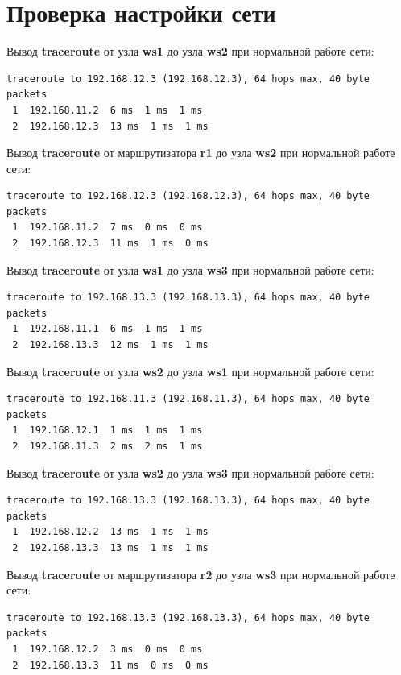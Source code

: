 \documentclass[a4paper,12pt]{article}
\begin{document}
\section{Проверка настройки сети}

Вывод \textbf{traceroute} от узла \textbf{ws1} до узла \textbf{ws2} при нормальной работе сети:

\begin{Verbatim}
traceroute to 192.168.12.3 (192.168.12.3), 64 hops max, 40 byte packets
 1  192.168.11.2  6 ms  1 ms  1 ms
 2  192.168.12.3  13 ms  1 ms  1 ms
\end{Verbatim}

Вывод \textbf{traceroute} от маршрутизатора \textbf{r1} до узла \textbf{ws2} при нормальной работе сети:

\begin{Verbatim}
traceroute to 192.168.12.3 (192.168.12.3), 64 hops max, 40 byte packets
 1  192.168.11.2  7 ms  0 ms  0 ms
 2  192.168.12.3  11 ms  1 ms  0 ms
\end{Verbatim}

Вывод \textbf{traceroute} от узла \textbf{ws1} до узла \textbf{ws3} при нормальной работе сети:

\begin{Verbatim}
traceroute to 192.168.13.3 (192.168.13.3), 64 hops max, 40 byte packets
 1  192.168.11.1  6 ms  1 ms  1 ms
 2  192.168.13.3  12 ms  1 ms  1 ms
\end{Verbatim}

Вывод \textbf{traceroute} от узла \textbf{ws2} до узла \textbf{ws1} при нормальной работе сети:

\begin{Verbatim}
traceroute to 192.168.11.3 (192.168.11.3), 64 hops max, 40 byte packets
 1  192.168.12.1  1 ms  1 ms  1 ms
 2  192.168.11.3  2 ms  2 ms  1 ms
\end{Verbatim}

Вывод \textbf{traceroute} от узла \textbf{ws2} до узла \textbf{ws3} при нормальной работе сети:

\begin{Verbatim}
traceroute to 192.168.13.3 (192.168.13.3), 64 hops max, 40 byte packets
 1  192.168.12.2  13 ms  1 ms  1 ms
 2  192.168.13.3  13 ms  1 ms  1 ms
\end{Verbatim}

Вывод \textbf{traceroute} от маршрутизатора \textbf{r2} до узла \textbf{ws3} при нормальной работе сети:

\begin{Verbatim}
traceroute to 192.168.13.3 (192.168.13.3), 64 hops max, 40 byte packets
 1  192.168.12.2  3 ms  0 ms  0 ms
 2  192.168.13.3  11 ms  0 ms  0 ms
\end{Verbatim}
\end{document}
